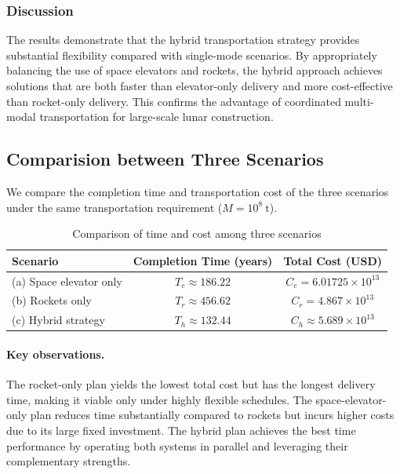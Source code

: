 \documentclass{mcmthesis}
\begin{document}
\subsubsection{Discussion}

The results demonstrate that the hybrid transportation strategy provides substantial flexibility compared with single-mode scenarios.
By appropriately balancing the use of space elevators and rockets, the hybrid approach achieves solutions that are both faster than elevator-only delivery and more cost-effective than rocket-only delivery.
This confirms the advantage of coordinated multi-modal transportation for large-scale lunar construction.

\subsection{Comparision between Three Scenarios}

We compare the completion time and transportation cost of the three scenarios under the same transportation requirement ($M=10^8~\text{t}$).

\begin{table}[H]
    \centering
    \caption{Comparison of time and cost among three scenarios}
    \label{tab:scenario_comparison}
    \begin{tabular}{lcc}
        \toprule
        \textbf{Scenario}       & \textbf{Completion Time (years)} & \textbf{Total Cost (USD)}         \\
        \midrule
        (a) Space elevator only & $T_e \approx 186.22$             & $C_e = 6.01725\times 10^{13}$     \\
        (b) Rockets only        & $T_r \approx 456.62$             & $C_r = 4.867\times 10^{13}$       \\
        (c) Hybrid strategy     & $T_h \approx 132.44$             & $C_h \approx 5.689\times 10^{13}$ \\
        \bottomrule
    \end{tabular}
\end{table}

\paragraph{\textbf{Key observations.}}

The rocket-only plan yields the lowest total cost but has the longest delivery time, making it viable only under highly flexible schedules. The space-elevator-only plan reduces time substantially compared to rockets but incurs higher costs due to its large fixed investment. The hybrid plan achieves the best time performance by operating both systems in parallel and leveraging their complementary strengths.
\end{document}
